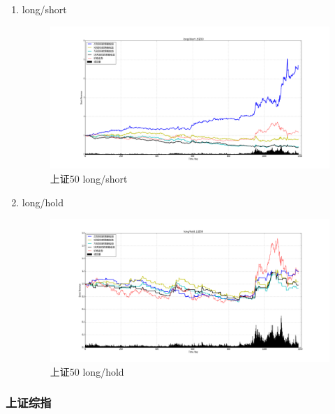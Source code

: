 \documentclass[12pt,a4paper]{article}
\begin{document}
\begin{enumerate}
\item long/short 
\begin{figure}[H]
	\centering
	\includegraphics[width=1.0\textwidth]{img_r_5/sz50.png}
	\caption{上证50 long/short}
\end{figure}

\item long/hold 
\begin{figure}[H]
	\centering
	\includegraphics[width=1.0\textwidth]{img_r_5/sz50_1.png}
	\caption{上证50 long/hold}
\end{figure}
\end{enumerate}

\subsubsection{上证综指}
\end{document}
